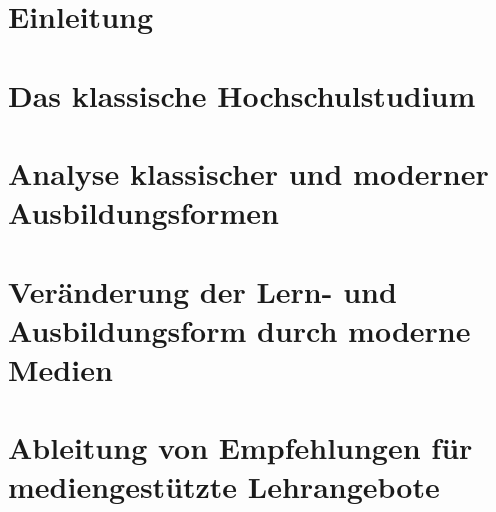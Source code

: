 \documentclass[150]{HSMW-Thesis}
\begin{document}



\begin{Referat}
\end{Referat}

\begin{Vorwort}
\end{Vorwort}

\Hauptteil

\chapter{Einleitung}
\cite{Schulmeister2013}

\cite{Schulmeister2013}
\chapter{Das klassische Hochschulstudium}

\chapter{Analyse klassischer und moderner Ausbildungsformen}

\chapter{Veränderung der Lern- und Ausbildungsform durch moderne Medien}

\chapter{Ableitung von Empfehlungen für mediengestützte Lehrangebote}


\Anhang



\end{document}
